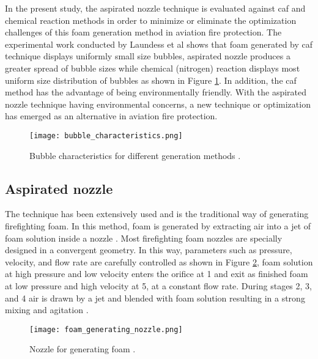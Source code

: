 In the present study, the aspirated nozzle technique is evaluated against \acrshort{caf} and chemical reaction methods in order to minimize or eliminate the optimization challenges of this foam generation method in aviation fire protection. The experimental work conducted by Laundess et al \cite{laundess2012suppression} shows that foam generated by \acrshort{caf} technique displays uniformly small size bubbles, aspirated nozzle produces a greater spread of bubble sizes while chemical (nitrogen) reaction displays most uniform size distribution of bubbles as shown in Figure \ref{ch2:figure:characteristics}. In addition, the \acrshort{caf} method has the advantage of being environmentally friendly.  With the aspirated nozzle technique having environmental concerns, a new technique or optimization has emerged as an alternative in aviation fire protection.

\begin{figure}[H]
    \centering
    \texttt{[image: bubble\_characteristics.png]}
    \caption{Bubble characteristics for different generation methods \cite{laundess2012suppression}.}
    \label{ch2:figure:characteristics}
\end{figure}

\subsection{Aspirated nozzle}
The technique has been extensively used and is the traditional way of generating firefighting foam. In this method, foam is generated by extracting air into a jet of foam solution inside a nozzle \cite{xi2017experimental}. Most firefighting foam nozzles are specially designed in a convergent geometry. In this way, parameters such as pressure, velocity, and flow rate are carefully controlled as shown in Figure \ref{ch2:figure:nozzle}, foam solution at high pressure and low velocity enters the orifice at 1 and exit as finished foam at low pressure and high velocity at 5, at a constant flow rate. During stages 2, 3, and 4 air is drawn by a jet and blended with foam solution resulting in a strong mixing and agitation \cite{csb2016phenomenological}.

\begin{figure}[H]
    \centering
    \texttt{[image: foam\_generating\_nozzle.png]}
    \caption{Nozzle for generating foam \cite{csb2016phenomenological}.}
    \label{ch2:figure:nozzle}
\end{figure}


